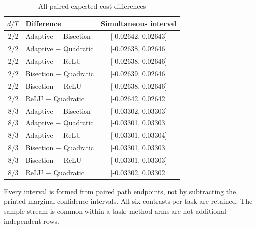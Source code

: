 \begin{table}[htbp]
\centering
\caption{All paired expected-cost differences}\label{tab:differences67}
{\small\setlength{\tabcolsep}{4pt}
\begin{tabular}{rlc}
\toprule
$d/T$ & Difference & Simultaneous interval \\
\midrule
2/2 & Adaptive $-$ Bisection & [-0.02642, 0.02643] \\
2/2 & Adaptive $-$ Quadratic & [-0.02638, 0.02646] \\
2/2 & Adaptive $-$ ReLU & [-0.02638, 0.02646] \\
2/2 & Bisection $-$ Quadratic & [-0.02639, 0.02646] \\
2/2 & Bisection $-$ ReLU & [-0.02638, 0.02646] \\
2/2 & ReLU $-$ Quadratic & [-0.02642, 0.02642] \\
8/3 & Adaptive $-$ Bisection & [-0.03302, 0.03303] \\
8/3 & Adaptive $-$ Quadratic & [-0.03301, 0.03303] \\
8/3 & Adaptive $-$ ReLU & [-0.03301, 0.03304] \\
8/3 & Bisection $-$ Quadratic & [-0.03301, 0.03303] \\
8/3 & Bisection $-$ ReLU & [-0.03301, 0.03303] \\
8/3 & ReLU $-$ Quadratic & [-0.03302, 0.03302] \\
\bottomrule
\end{tabular}}
\par\smallskip
{\footnotesize Every interval is formed from paired path endpoints, not by subtracting the printed marginal confidence intervals. All six contrasts per task are retained. The sample stream is common within a task; method arms are not additional independent rows.}
\end{table}
